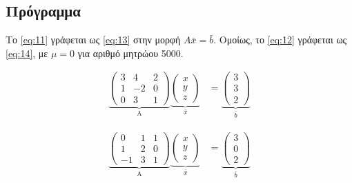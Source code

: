 \documentclass[12pt]{extreport}
\begin{document}
\subsection{Πρόγραμμα}

Το \eqref{eq:11} γράφεται ως \eqref{eq:13} στην μορφή $A\bar{x}=\bar{b}$. Ομοίως, το \eqref{eq:12} γράφεται ως \eqref{eq:14},  με $\mu = 0$ για αριθμό μητρώου 5000.

\begin{equation}%
    \begin{aligned}
        \underbrace{
            \begin{pmatrix}
                3 & 4  & 2 \\
                1 & -2 & 0 \\
                0 & 3  & 1
            \end{pmatrix}
        }_\text{A}
        \underbrace{
            \begin{pmatrix}
                x \\
                y \\
                z
            \end{pmatrix}
        }_\text{$\bar{x}$}
         & =
        \underbrace{
            \begin{pmatrix}
                3 \\
                3 \\
                2
            \end{pmatrix}
        }_\text{$\bar{b}$}
    \end{aligned}\label{eq:13}
\end{equation}

\begin{equation}%
    \begin{aligned}
        \underbrace{
            \begin{pmatrix}
                0  & 1 & 1 \\
                1  & 2 & 0 \\
                -1 & 3 & 1
            \end{pmatrix}
        }_\text{A}
        \underbrace{
            \begin{pmatrix}
                x \\
                y \\
                z
            \end{pmatrix}
        }_\text{$\bar{x}$}
         & =
        \underbrace{
            \begin{pmatrix}
                3 \\
                0 \\
                2
            \end{pmatrix}
        }_\text{$\bar{b}$}
    \end{aligned}\label{eq:14}
\end{equation}
\end{document}
